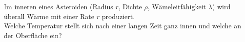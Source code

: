 \begin{Exercise}[label = Asteroidentemperatur, origin = {???}, title = Asteroidentemperatur ,difficulty = 3]
Im inneren eines Asteroiden (Radius $r$, Dichte $\rho$, Wämeleitfähigkeit $\lambda$) wird überall Wärme mit einer Rate $r$ produziert.\\
Welche Temperatur stellt sich nach einer langen Zeit ganz innen und welche an der Oberfläche ein?   	
\end{Exercise}
